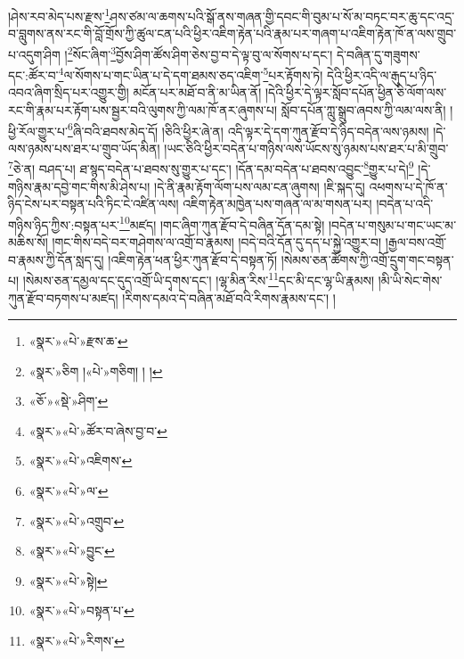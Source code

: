 །ཤེས་རབ་མེད་པས་རྫས་\footnote{«སྣར་»«པེ་»རྫས་ཆ་}ཤས་ཙམ་ལ་ཆགས་པའི་སྒོ་ནས་གཞན་གྱི་དབང་གི་བུམ་པ་སོ་མ་བཏང་བར་ཆུ་དང་འདྲ་བ་བླུགས་ནས་རང་གི་བློ་གྲོས་ཀྱི་ཚུལ་ངན་པའི་ཕྱིར་འཇིག་རྟེན་པའི་རྣམ་པར་གཞག་པ་འཇིག་རྟེན་ཁོ་ན་ལས་གྲུབ་པ་འདུག་ཤིག །\footnote{«སྣར་»ཅིག །«པེ་»གཅིག། ། །}སོང་ཞིག་\footnote{«ཅོ་»«སྡེ་»ཤིག་}བྱོས་ཤིག་ཚོས་ཤིག་ཅེས་བྱ་བ་དེ་ལྟ་བུ་ལ་སོགས་པ་དང་། དེ་བཞིན་དུ་གཟུགས་དང་:ཚོར་བ་\footnote{«སྣར་»«པེ་»ཚོར་བ་ཞེས་བྱ་བ་}ལ་སོགས་པ་གང་ཡིན་པ་དེ་དག་ཐམས་ཅད་འཇིག་\footnote{«སྣར་»«པེ་»འཇིགས་}པར་རྟོགས་ཏེ། དེའི་ཕྱིར་འདི་ལ་རྒུད་པ་ཉིད་འབའ་ཞིག་སྲིད་པར་འགྱུར་གྱི། མངོན་པར་མཐོ་བ་ནི་མ་ཡིན་ནོ། །དེའི་ཕྱིར་དེ་ལྟར་སློབ་དཔོན་ཕྱིན་ཅི་ལོག་ལས་རང་གི་རྣམ་པར་རྟོག་པས་སྦྱར་བའི་ལུགས་ཀྱི་ལམ་ཁོ་ནར་ཞུགས་པ། སློབ་དཔོན་ཀླུ་སྒྲུབ་ཞབས་ཀྱི་ལམ་ལས་ནི། །ཕྱི་རོལ་གྱུར་པ་\footnote{«སྣར་»«པེ་»ལ་}ཞི་བའི་ཐབས་མེད་དོ། །ཅིའི་ཕྱིར་ཞེ་ན། འདི་ལྟར་དེ་དག་ཀུན་རྫོབ་དེ་ཉིད་བདེན་ལས་ཉམས། །དེ་ལས་ཉམས་པས་ཐར་པ་གྲུབ་ཡོད་མིན། །ཡང་ཅིའི་ཕྱིར་བདེན་པ་གཉིས་ལས་ཡོངས་སུ་ཉམས་པས་ཐར་པ་མི་གྲུབ་\footnote{«སྣར་»«པེ་»འགྲུབ་}ཅེ་ན། བཤད་པ། ཐ་སྙད་བདེན་པ་ཐབས་སུ་གྱུར་པ་དང་། །དོན་དམ་བདེན་པ་ཐབས་འབྱུང་\footnote{«སྣར་»«པེ་»བྱུང་}གྱུར་པ་དེ།\footnote{«སྣར་»«པེ་»སྟེ།} །དེ་གཉིས་རྣམ་དབྱེ་གང་གིས་མི་ཤེས་པ། །དེ་ནི་རྣམ་རྟོག་ལོག་པས་ལམ་ངན་ཞུགས། །ཇི་སྐད་དུ། འཕགས་པ་དེ་ཁོ་ན་ཉིད་ངེས་པར་བསྟན་པའི་ཏིང་ངེ་འཛིན་ལས། འཇིག་རྟེན་མཁྱེན་པས་གཞན་ལ་མ་གསན་པར། །བདེན་པ་འདི་གཉིས་ཉིད་ཀྱིས་:བསྟན་པར་\footnote{«སྣར་»«པེ་»བསྟན་པ་}མཛད། །གང་ཞིག་ཀུན་རྫོབ་དེ་བཞིན་དོན་དམ་སྟེ། །བདེན་པ་གསུམ་པ་གང་ཡང་མ་མཆིས་སོ། །གང་གིས་བདེ་བར་གཤེགས་ལ་འགྲོ་བ་རྣམས། །བདེ་བའི་དོན་དུ་དད་པ་སྐྱེ་འགྱུར་བ། །རྒྱལ་བས་འགྲོ་བ་རྣམས་ཀྱི་དོན་སླད་དུ། །འཇིག་རྟེན་ཕན་ཕྱིར་ཀུན་རྫོབ་དེ་བསྟན་ཏོ། །སེམས་ཅན་ཚོགས་ཀྱི་འགྲོ་དྲུག་གང་བསྟན་པ། །སེམས་ཅན་དམྱལ་དང་དུད་འགྲོ་ཡི་དྭགས་དང་། །ལྷ་མིན་རིས་\footnote{«སྣར་»«པེ་»རིགས་}དང་མི་དང་ལྷ་ཡི་རྣམས། །མི་ཡི་སེང་གེས་ཀུན་རྫོབ་བཏགས་པ་མཛད། །རིགས་དམའ་དེ་བཞིན་མཐོ་བའི་རིགས་རྣམས་དང་། །
